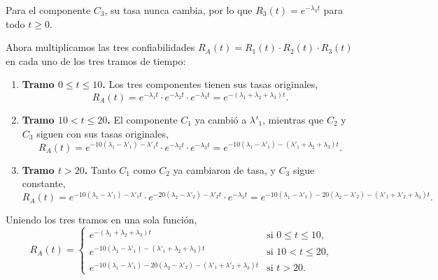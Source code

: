 \documentclass[main.tex]{subfiles}%
\begin{document}
Para el componente $C_3$, su tasa nunca cambia, por lo que $R_3(t) = e^{-\lambda_3 t}$ para todo $t \ge 0$.

\vspace{3mm}
Ahora multiplicamos las tres confiabilidades $R_A(t) = R_1(t) \cdot R_2(t) \cdot R_3(t)$ en cada uno de los tres tramos de tiempo:

\begin{enumerate}
    \item \textbf{Tramo $0 \le t \le 10$.} Los tres componentes tienen sus tasas originales,
    \begin{equation*}
        R_A(t) = e^{-\lambda_1 t} \cdot e^{-\lambda_2 t} \cdot e^{-\lambda_3 t} = e^{-(\lambda_1 + \lambda_2 + \lambda_3)t}.
    \end{equation*}

    \item \textbf{Tramo $10 < t \le 20$.} El componente $C_1$ ya cambió a $\lambda'_1$, mientras que $C_2$ y $C_3$ siguen con sus tasas originales,
    \begin{equation*}
        R_A(t) = e^{-10(\lambda_1 - \lambda'_1) - \lambda'_1 t} \cdot e^{-\lambda_2 t} \cdot e^{-\lambda_3 t} = e^{-10(\lambda_1 - \lambda'_1) - (\lambda'_1 + \lambda_2 + \lambda_3)t}.
    \end{equation*}

    \item \textbf{Tramo $t > 20$.} Tanto $C_1$ como $C_2$ ya cambiaron de tasa, y $C_3$ sigue constante,
    \begin{equation*}
        R_A(t) = e^{-10(\lambda_1 - \lambda'_1) - \lambda'_1 t} \cdot e^{-20(\lambda_2 - \lambda'_2) - \lambda'_2 t} \cdot e^{-\lambda_3 t} = e^{-10(\lambda_1 - \lambda'_1) - 20(\lambda_2 - \lambda'_2) - (\lambda'_1 + \lambda'_2 + \lambda_3)t}.
    \end{equation*}
\end{enumerate}

\vspace{3mm}
Uniendo los tres tramos en una sola función,
\begin{equation*}
    R_A(t) = \begin{cases}
        e^{-(\lambda_1 + \lambda_2 + \lambda_3)t} & \text{si } 0 \le t \le 10, \\[2.5mm]
        e^{-10(\lambda_1 - \lambda'_1) - (\lambda'_1 + \lambda_2 + \lambda_3)t} & \text{si } 10 < t \le 20, \\[2.5mm]
        e^{-10(\lambda_1 - \lambda'_1) - 20(\lambda_2 - \lambda'_2) - (\lambda'_1 + \lambda'_2 + \lambda_3)t} & \text{si } t > 20.
    \end{cases}
\end{equation*}

\end{document}
